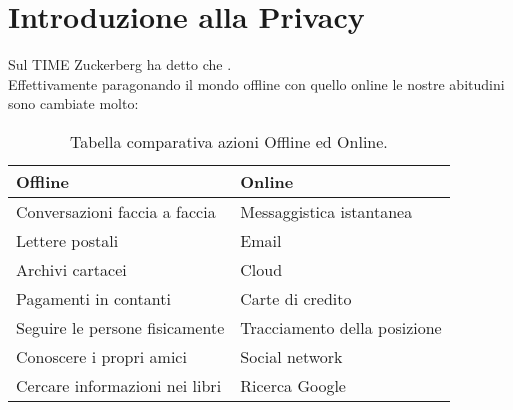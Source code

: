 \section{Introduzione alla Privacy}
\label{sec:introductiontoprivacy}
Sul TIME Zuckerberg ha detto che .\\
Effettivamente paragonando il mondo offline con quello online le nostre abitudini sono cambiate molto:

\begin{table}[h!]
\centering
\caption{Tabella comparativa azioni Offline ed Online.}
\label{table:offlineonline}
\begin{tabular}{ |l|l| }
    \hline
    \textbf{Offline} & \textbf{Online} \\
    \hline
    Conversazioni faccia a faccia & Messaggistica istantanea \\
    \hline
    Lettere postali & Email \\
    \hline
    Archivi cartacei & Cloud \\
    \hline
    Pagamenti in contanti & Carte di credito \\
    \hline
    Seguire le persone fisicamente & Tracciamento della posizione \\
    \hline
    Conoscere i propri amici & Social network \\
    \hline
    Cercare informazioni nei libri & Ricerca Google \\
    \hline
\end{tabular}
\end{table}

